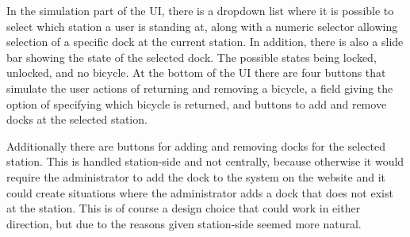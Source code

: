 In the simulation part of the UI, there is a dropdown list where it is possible to select which station a user is standing at, along with a numeric selector allowing selection of a specific dock at the current station.
In addition, there is also a slide bar showing the state of the selected dock.
The possible states being locked, unlocked, and no bicycle.
At the bottom of the UI there are four buttons that simulate the user actions of returning and removing a bicycle, a field giving the option of specifying which bicycle is returned, and buttons to add and remove docks at the selected station.

Additionally there are buttons for adding and removing docks for the selected station. 
This is handled station-side and not centrally, because otherwise it would require the administrator to add the dock to the system on the website and it could create situations where the administrator adds a dock that does not exist at the station.  
This is of course a design choice that could work in either direction, but due to the reasons given station-side seemed more natural.